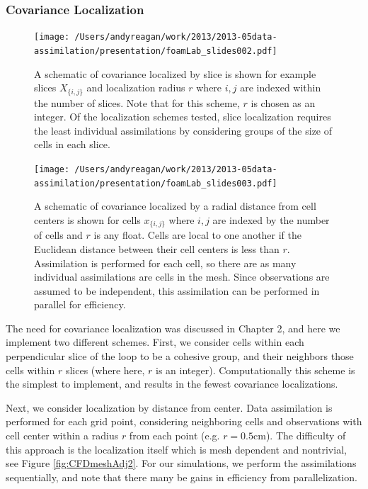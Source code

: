 \documentclass[12pt]{report}
\begin{document}
\subsubsection{Covariance Localization}

\begin{figure}[h!]
  \centering
  \texttt{[image: /Users/andyreagan/work/2013/2013-05data-assimilation/presentation/foamLab\_slides002.pdf]}
  \caption[A schematic of covariance localized by slice is shown for example slices $X_{\{i,j\}}$ and localization radius $r$ where $i,j$ are indexed within the number of slices]{
    A schematic of covariance localized by slice is shown for example slices $X_{\{i,j\}}$ and localization radius $r$ where $i,j$ are indexed within the number of slices.
    Note that for this scheme, $r$ is chosen as an integer.
    Of the localization schemes tested, slice localization requires the least individual assimilations by considering groups of the size of cells in each slice.
  }
  \label{fig:localcovzones}
\end{figure}

\begin{figure}[h!]
  \centering
  \texttt{[image: /Users/andyreagan/work/2013/2013-05data-assimilation/presentation/foamLab\_slides003.pdf]}
  \caption[A schematic of covariance localized by a radial distance from cell centers is shown for cells $x_{\{i,j\}}$ where $i,j$ are indexed by the number of cells and $r$ is any float]{
    A schematic of covariance localized by a radial distance from cell centers is shown for cells $x_{\{i,j\}}$ where $i,j$ are indexed by the number of cells and $r$ is any float.
    Cells are local to one another if the Euclidean distance between their cell centers is less than $r$.
    Assimilation is performed for each cell, so there are as many individual assimilations are cells in the mesh.
    Since observations are assumed to be independent, this assimilation can be performed in parallel for efficiency.
  }
  \label{fig:localcovradii}
\end{figure}

The need for covariance localization was discussed in Chapter 2, and here we implement two different schemes.
First, we consider cells within each perpendicular slice of the loop to be a cohesive group, and their neighbors those cells within $r$ slices (where here, $r$ is an integer).
Computationally this scheme is the simplest to implement, and results in the fewest covariance localizations.

Next, we consider localization by distance from center.
Data assimilation is performed for each grid point, considering neighboring cells and observations with cell center within a radius $r$ from each point (e.g. $r = 0.5$cm).
The difficulty of this approach is the localization itself which is mesh dependent and nontrivial, see Figure \ref{fig:CFDmeshAdj2}.
For our simulations, we perform the assimilations sequentially, and note that there many be gains in efficiency from parallelization.
\end{document}
